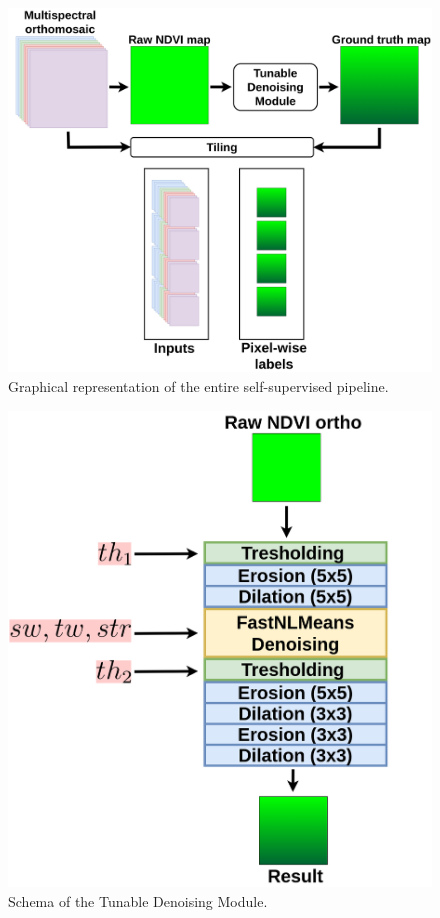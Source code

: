 \documentclass[comsoc,final]{IEEEtran}
\begin{document}
\begin{figure}
    \centering
    \includegraphics[width=0.8\columnwidth]{pipeline1}
    \caption{Graphical representation of the entire self-supervised pipeline.}
    \label{fig:entirepipeline}
\end{figure}

\begin{figure}
    \centering
    \includegraphics[width=0.75\columnwidth]{tunable_module}
    \caption{Schema of the Tunable Denoising Module.}
    \label{fig:tunable_module}
\end{figure}
\end{document}

